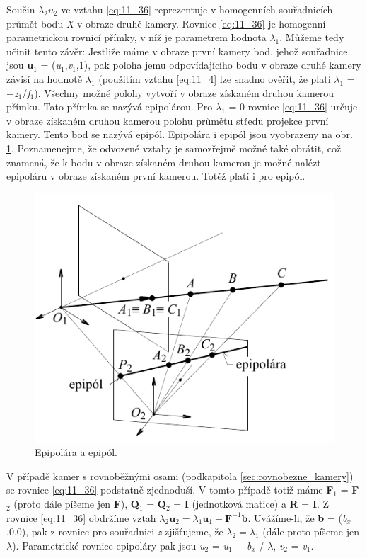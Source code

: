 Součin $\lambda_2 u_2$ ve vztahu \eqref{eq:11_36} reprezentuje v homogenních souřadnicích průmět bodu \textit{X} v obraze druhé kamery. Rovnice \eqref{eq:11_36} je homogenní parametrickou rovnicí přímky, v níž je parametrem hodnota $\lambda_1$. Můžeme tedy učinit tento závěr: Jestliže máme v obraze první kamery bod, jehož souřadnice jsou \textbf{u}$_1$ = (\textit{u}$_1$,\textit{v}$_1$,1), pak poloha jemu odpovídajícího bodu v obraze druhé kamery závisí na hodnotě $\lambda_1$ (použitím vztahu \eqref{eq:11_4} lze snadno ověřit, že platí $\lambda_1$ = $-$\textit{z}$_1$/\textit{f}$_1$). Všechny možné polohy vytvoří v obraze získaném druhou kamerou přímku. Tato přímka se nazývá epipolárou. Pro $\lambda_1$ = 0 rovnice \eqref{eq:11_36} určuje v obraze získaném druhou kamerou polohu průmětu středu projekce první kamery. Tento bod se nazývá epipól. Epipolára i epipól jsou vyobrazeny na obr. \ref{img:11_6}. Poznamenejme, že odvozené vztahy je samozřejmě možné také obrátit, což znamená, že k bodu v obraze získaném druhou kamerou je možné nalézt epipoláru v obraze získaném první kamerou. Totéž platí i pro epipól.

\begin{figure}[th]
    \begin{center}
        \includegraphics[scale=.9]{11_stereo/images/img_11_6.pdf}
    \end{center}
    \caption{Epipolára a epipól.}
    \label{img:11_6}
\end{figure}

V případě kamer s rovnoběžnými osami (podkapitola \ref{sec:rovnobezne_kamery}) se rovnice \eqref{eq:11_36} podstatně zjednoduší. V tomto případě totiž máme \textbf{F}$_1$ = \textbf{F}$_2$ (proto dále píšeme jen \textbf{F}), \textbf{Q}$_1$ =  \textbf{Q}$_2$ = \textbf{I} (jednotková matice) a \textbf{R} = \textbf{I}. Z rovnice \eqref{eq:11_36} obdržíme vztah $\lambda_2 \mathbf{u}_2 = \lambda_1 \mathbf{u}_1 - \mathbf{F}^{-1} \mathbf{b}$. Uvážíme-li, že \textbf{b} = (\textit{b}$_x$,0,0), pak z rovnice pro souřadnici \textit{z} zjišťujeme, že $\lambda_2 = \lambda_1$ (dále proto píšeme jen $\lambda$). Parametrické rovnice epipoláry pak jsou \textit{u}$_2$ = \textit{u}$_1$ $-$ \textit{b}$_x$ / $\lambda$, \textit{v}$_2$ = \textit{v}$_1$.

